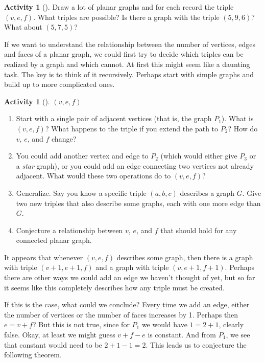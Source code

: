 \documentclass[10pt,]{book}
\theoremstyle{plain}
\theoremstyle{definition}
\theoremstyle{definition}
\theoremstyle{definition}
\newtheorem{activity}[project]{Activity}
\numberwithin{equation}{chapter}
\begin{document}
\begin{activity}[]\label{activity-15}
\hypertarget{p-211}{}%
Draw a lot of planar graphs and for each record the triple \((v,e,f)\).  What triples are possible? Is there a graph with the triple \((5, 9, 6)\)?  What about \((5,7,5)\)?%
\end{activity}
\hypertarget{p-212}{}%
If we want to understand the relationship between the number of vertices, edges and faces of a planar graph, we could first try to decide which triples can be realized by a graph and which cannot.  At first this might seem like a daunting task.  The key is to think of it recursively.  Perhaps start with simple graphs and build up to more complicated ones.%
\begin{activity}[]\label{activity-16}
\((v,e,f)\)\begin{enumerate}[font=\bfseries,label=(\alph*),ref=\alph*]
\item\label{task-20} \hypertarget{p-213}{}%
Start with a single pair of adjacent vertices (that is, the graph \(P_1\)).  What is \((v,e,f)\)?  What happens to the triple if you extend the path to \(P_2\)?  How do \(v\), \(e\), and \(f\) change?%
\item\label{task-21} \hypertarget{p-214}{}%
You could add another vertex and edge to \(P_2\) (which would either give \(P_3\) or a \emph{star} graph), or you could add an edge connecting two vertices not already adjacent.  What would these two operations do to \((v,e,f)\)?%
\item\label{task-22} \hypertarget{p-215}{}%
Generalize.  Say you know a specific triple \((a,b,c)\) describes a graph \(G\).  Give two new triples that also describe some graphs, each with one more edge than \(G\).%
\item\label{task-23} \hypertarget{p-216}{}%
Conjecture a relationship between \(v\), \(e\), and \(f\) that should hold for any connected planar graph.%
\end{enumerate}
\end{activity}
\hypertarget{p-217}{}%
It appears that whenever \((v,e,f)\) describes some graph, then there is a graph with triple \((v+1, e+1, f)\) and a graph with triple \((v,e+1, f+1)\).  Perhaps there are other ways we could add an edge we haven't thought of yet, but so far it seems like this completely describes how any triple must be created.%
\par
\hypertarget{p-218}{}%
If this is the case, what could we conclude?  Every time we add an edge, either the number of vertices or the number of faces increases by 1.  Perhaps then \(e = v + f\)?  But this is not true, since for \(P_1\) we would have \(1 = 2 + 1\), clearly false.  Okay, at least we might guess \(v + f - e\) is constant.  And from \(P_1\), we see that constant would need to be \(2 + 1 - 1 = 2\).  This leads us to conjecture the following theorem.%
\end{document}

